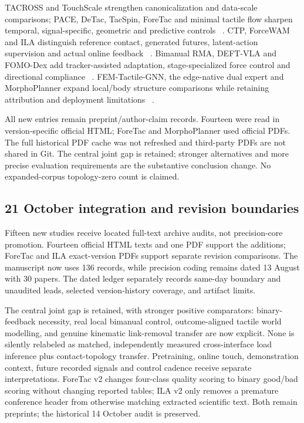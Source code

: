 TACROSS and TouchScale strengthen canonicalization and data-scale comparisons;
PACE, DeTac, TacSpin, ForeTac and minimal tactile flow sharpen temporal,
signal-specific, geometric and predictive controls
~\cite{chen2026tacross,li2026touchscale,chen2026pace,zhang2026detac,
wu2026tacspin,chen2026foretac,martinezbernal2026minimalflow}.
CTP, ForceWAM and ILA distinguish reference contact, generated futures,
latent-action supervision and actual online feedback
~\cite{nie2026ctp,xu2026forcewam,zheng2026ila}.
Bimanual RMA, DEFT-VLA and FOMO-Dex add tracker-assisted adaptation,
stage-specialized force control and directional compliance
~\cite{joo2026bimanualrma,huang2026deftvla,yuan2026fomodex}.
FEM-Tactile-GNN, the edge-native dual expert and MorphoPlanner expand local/body
structure comparisons while retaining attribution and deployment limitations
~\cite{terrile2026femtactile,zheng2026edgenative,wang2026morphoplanner}.

All new entries remain preprint/author-claim records. Fourteen were read in
version-specific official HTML; ForeTac and MorphoPlanner used official PDFs.
The full historical PDF cache was not refreshed and third-party PDFs are not
shared in Git. The central joint gap is retained; stronger alternatives and
more precise evaluation requirements are the substantive conclusion change.
No expanded-corpus topology-zero count is claimed.

\subsection{21 October integration and revision boundaries}

Fifteen new studies receive located full-text archive audits, not precision-core
promotion. Fourteen official HTML texts and one PDF support the additions;
ForeTac and ILA exact-version PDFs support separate revision comparisons.
The manuscript now uses 136 records, while precision coding remains dated
13 August with 30 papers. The dated ledger separately records same-day boundary
and unaudited leads, selected version-history coverage, and artifact limits.

The central joint gap is retained, with stronger positive comparators:
binary-feedback necessity, real local bimanual control, outcome-aligned tactile
world modelling, and genuine kinematic link-removal transfer are now explicit.
None is silently relabeled as matched, independently measured cross-interface
load inference plus contact-topology transfer. Pretraining, online touch,
demonstration context, future recorded signals and control cadence receive
separate interpretations. ForeTac v2 changes four-class quality scoring to
binary good/bad scoring without changing reported tables; ILA v2 only removes
a premature conference header from otherwise matching extracted scientific text.
Both remain preprints; the historical 14 October audit is preserved.


